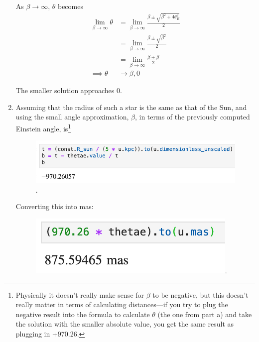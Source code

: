 \documentclass[11pt,letterpaper]{article}
\begin{document}
\begin{enumerate}[label=(\roman*)]
        As $\beta \rightarrow \infty$, $\theta$ becomes 
        \begin{align*}
            \lim_{\beta\to\infty}\theta &= \lim_{\beta\to\infty}\frac{\beta\pm\sqrt{\beta^2+4\theta_E^2}}{2} \\
            &= \lim_{\beta\to\infty}\frac{\beta\pm\sqrt{\beta^2}}{2} \\
            &= \lim_{\beta\to\infty}\frac{\beta \pm \beta}{2} \\
            \implies \theta &\rightarrow \beta, 0
        \end{align*}

        The smaller solution approaches 0. 

    \item Assuming that the radius of such a star is the same as that of the Sun, and using the small angle approximation, $\beta$, in terms of the previously computed Einstein angle, is\footnote{Physically it doesn't really make sense for $\beta$ to be negative, but this doesn't really matter in terms of calculating distances—if you try to plug the negative result into the formula to calculate $\theta$ (the one from part a) and take the solution with the smaller absolute value, you get the same result as plugging in +970.26.}
        \begin{figure}[!ht]
            \centering
            \includegraphics[width=0.8\linewidth]{figures/beta1.png}.
        \end{figure}

        Converting this into mas:
        \begin{figure}[!ht]
            \centering
            \includegraphics[width=0.4\linewidth]{figures/beta2.png}.
        \end{figure}


\end{enumerate}
\end{document}
